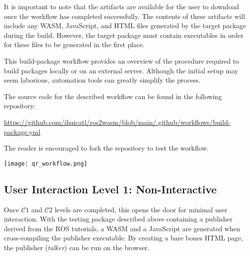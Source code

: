         It is important to note that the artifacts are available for the user to download once the workflow has completed successfully. The contents of these artifacts will include any \ac{WASM}, JavaScript, and \ac{HTML} files generated by the target package during the build. However, the target package must contain executables in order for these files to be generated in the first place.

        This \textsf{build-package} workflow provides an overview of the procedure required to build packages locally or on an external server. Although the initial setup may seem laborious, automation tools can greatly simplify the process. 

        \vspace{0.5em}
        \begin{tcolorbox}[title=Example 3]
            \begin{minipage}[t]{0.87\linewidth}
                \vspace*{0pt}
                The source code for the described workflow can be found in the following repository:

                \href{https://github.com/ihuicatl/ros2wasm/blob/main/.github/workflows/build-package.yml}{\footnotesize{\textsf{https://github.com/ihuicatl/ros2wasm/blob/main/.github/workflows/build-package.yml}}}

                The reader is encouraged to fork the repository to test the workflow.
            \end{minipage}\hfill%
            \begin{minipage}[t]{0.1\linewidth}
                \vspace*{0pt}
                \texttt{[image: qr\_workflow.png]}
            \end{minipage}
        \end{tcolorbox}

        \subsection{User Interaction Level 1: Non-Interactive}

        Once $\mathcal{C}1$ and $\mathcal{C}2$ levels are completed, this opens the door for minimal user interaction. With the testing package described above containing a publisher derived from the \ac{ROS} tutorials, a \ac{WASM} and a JavaScript are generated when cross-compiling the publisher executable. By creating a bare bones \ac{HTML} page, the publisher (\textit{talker}) can be run on the browser.

